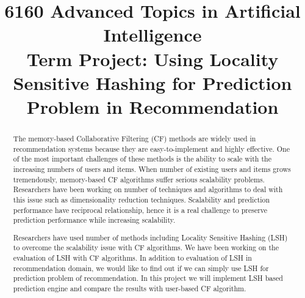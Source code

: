 \documentclass[conference]{IEEEtran}
\begin{document}
%
\title {6160 Advanced Topics in Artificial Intelligence \\Term Project: Using Locality Sensitive Hashing for Prediction Problem in Recommendation}

\author{
 }



% 




\maketitle


\begin{abstract}

The memory-based Collaborative Filtering (CF) methods are widely used in
recommendation systems because they are easy-to-implement and highly
effective. One of the most important challenges of these methods is the
ability to scale with the increasing numbers of users and items. When
number of existing users and items grows tremendously, memory-based CF 
algorithms suffer serious scalability problems. Researchers have been 
working on number of techniques and algorithms to deal with this issue 
such as dimensionality reduction techniques. Scalability and prediction 
performance have reciprocal relationship, hence it is a real challenge to 
preserve prediction performance while increasing scalability.

Researchers have used number of methods including Locality Sensitive 
Hashing (LSH) to overcome the scalability issue with CF algorithms. 
We have been working on the evaluation of LSH with CF algorithms. 
In addition to evaluation of LSH in recommendation domain, we 
would like to find out if we can simply use LSH for prediction problem of 
recommendation. In this project we will implement LSH based prediction engine 
and compare the results with user-based CF algorithm.

\end{abstract}
\end{document}
